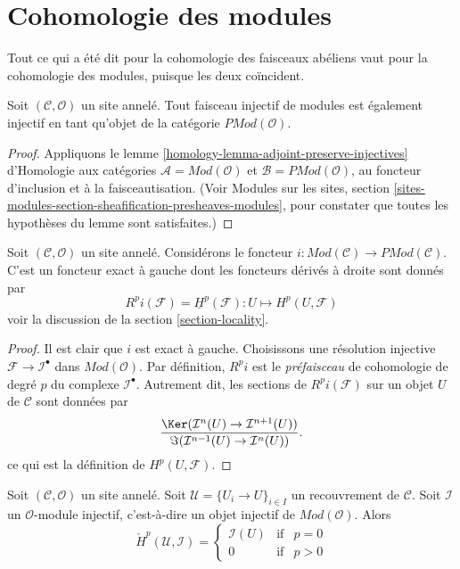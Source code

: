 \section{Cohomologie des modules}
\label{section-cohomology-modules}

\noindent
Tout ce qui a été dit pour la cohomologie des faisceaux abéliens vaut pour la
cohomologie des modules, puisque les deux coïncident.

\begin{lemma}
\label{lemma-injective-module-injective-presheaf}
Soit $(\mathcal{C}, \mathcal{O})$ un site annelé.
Tout faisceau injectif de modules est également injectif en tant qu'objet de
la catégorie $\textit{PMod}(\mathcal{O})$.
\end{lemma}

\begin{proof}
Appliquons le lemme \ref{homology-lemma-adjoint-preserve-injectives}
d'Homologie aux catégories $\mathcal{A} = \textit{Mod}(\mathcal{O})$ et
$\mathcal{B} = \textit{PMod}(\mathcal{O})$, au foncteur d'inclusion et à la
faisceautisation. (Voir Modules sur les sites, section
\ref{sites-modules-section-sheafification-presheaves-modules}, pour constater
que toutes les hypothèses du lemme sont satisfaites.)
\end{proof}

\begin{lemma}
\label{lemma-include-modules}
Soit $(\mathcal{C}, \mathcal{O})$ un site annelé.
Considérons le foncteur
$i : \textit{Mod}(\mathcal{C}) \to \textit{PMod}(\mathcal{C})$.
C'est un foncteur exact à gauche dont les foncteurs dérivés à droite sont
donnés par
$$
R^pi(\mathcal{F}) = \underline{H}^p(\mathcal{F}) :
U \longmapsto H^p(U, \mathcal{F})
$$
voir la discussion de la section \ref{section-locality}.
\end{lemma}

\begin{proof}
Il est clair que $i$ est exact à gauche.
Choisissons une résolution injective $\mathcal{F} \to \mathcal{I}^\bullet$
dans $\textit{Mod}(\mathcal{O})$.
Par définition, $R^pi$ est le {\it préfaisceau} de cohomologie de degré $p$
du complexe $\mathcal{I}^\bullet$. Autrement dit, les sections de
$R^pi(\mathcal{F})$ sur un objet $U$ de $\mathcal{C}$ sont données par
$$
\frac{\Ker(\mathcal{I}^n(U) \to \mathcal{I}^{n + 1}(U))}
{\Im(\mathcal{I}^{n - 1}(U) \to \mathcal{I}^n(U))}.
$$
ce qui est la définition de $H^p(U, \mathcal{F})$.
\end{proof}

\begin{lemma}
\label{lemma-injective-module-trivial-cech}
Soit $(\mathcal{C}, \mathcal{O})$ un site annelé.
Soit $\mathcal{U} = \{U_i \to U\}_{i \in I}$ un recouvrement de
$\mathcal{C}$. Soit $\mathcal{I}$ un $\mathcal{O}$-module injectif,
c'est-à-dire un objet injectif de $\textit{Mod}(\mathcal{O})$. Alors
$$
\check{H}^p(\mathcal{U}, \mathcal{I}) =
\left\{
\begin{matrix}
\mathcal{I}(U) & \text{if} & p = 0 \\
0 & \text{if} & p > 0
\end{matrix}
\right.
$$
\end{lemma}


